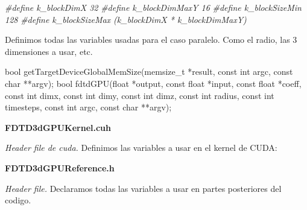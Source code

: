 \documentclass[]{article}
\newenvironment{Shaded}{\begin{snugshade}}{\end{snugshade}}
\newcommand{\DataTypeTok}[1]{\textcolor[rgb]{0.13,0.29,0.53}{{#1}}}
\newcommand{\PreprocessorTok}[1]{\textcolor[rgb]{0.56,0.35,0.01}{\textit{{#1}}}}
\newcommand{\AttributeTok}[1]{\textcolor[rgb]{0.77,0.63,0.00}{{#1}}}
\newcommand{\NormalTok}[1]{{#1}}
\begin{document}
\begin{Shaded}
\begin{Highlighting}[]
\PreprocessorTok{#define k_blockDimX    32}
\PreprocessorTok{#define k_blockDimMaxY 16}
\PreprocessorTok{#define k_blockSizeMin 128}
\PreprocessorTok{#define k_blockSizeMax (k_blockDimX * k_blockDimMaxY)}
\end{Highlighting}
\end{Shaded}

Definimos todas las variables usadas para el caso paralelo. Como el
radio, las 3 dimensiones a usar, etc.

\begin{Shaded}
\begin{Highlighting}[]
\DataTypeTok{bool} \NormalTok{getTargetDeviceGlobalMemSize(}\DataTypeTok{memsize_t} \NormalTok{*result, }\AttributeTok{const} \DataTypeTok{int} \NormalTok{argc, }\AttributeTok{const} \DataTypeTok{char} \NormalTok{**argv);}
\DataTypeTok{bool} \NormalTok{fdtdGPU(}\DataTypeTok{float} \NormalTok{*output, }\AttributeTok{const} \DataTypeTok{float} \NormalTok{*input, }\AttributeTok{const} \DataTypeTok{float} \NormalTok{*coeff, }\AttributeTok{const} \DataTypeTok{int} \NormalTok{dimx, }\AttributeTok{const} \DataTypeTok{int} \NormalTok{dimy, }\AttributeTok{const} \DataTypeTok{int} \NormalTok{dimz, }\AttributeTok{const} \DataTypeTok{int} \NormalTok{radius, }\AttributeTok{const} \DataTypeTok{int} \NormalTok{timesteps, }\AttributeTok{const} \DataTypeTok{int} \NormalTok{argc, }\AttributeTok{const} \DataTypeTok{char} \NormalTok{**argv);}
\end{Highlighting}
\end{Shaded}

\textbf{FDTD3dGPUKernel.cuh}

\emph{Header file de cuda.} Definimos las variables a usar en el kernel
de CUDA:

\textbf{FDTD3dGPUReference.h}

\emph{Header file.} Declaramos todas las variables a usar en partes
posteriores del codigo.
\end{document}
